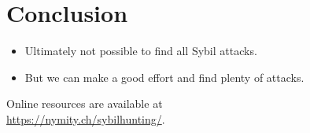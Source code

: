 \section{Conclusion}
\label{sec:conclusion}

\begin{itemize}
	\item Ultimately not possible to find all Sybil attacks.
	\item But we can make a good effort and find plenty of attacks.
\end{itemize}

Online resources are available at \\ \url{https://nymity.ch/sybilhunting/}.
